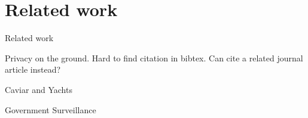 
\section{Related work}
\label{sec:related}

Related work

Privacy on the ground. Hard to find citation in bibtex. Can cite a related journal article instead?

Caviar and Yachts \cite{johnsoncaviar}

Government Surveillance \cite{laskowskigovernment}

